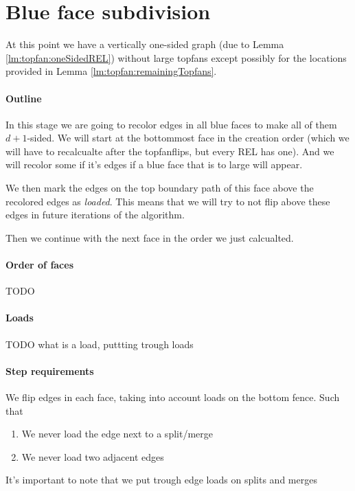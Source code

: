 
\section{Blue face subdivision}
\label{s:subdiv}


At this point we have a vertically one-sided graph (due to Lemma \ref{lm:topfan:oneSidedREL}) without large topfans except possibly for the locations provided in Lemma \ref{lm:topfan:remainingTopfans}.

\paragraph{Outline}
In this stage we are going to recolor edges in all blue faces to make all of them $d+1$-sided. We will start at the bottommost face in the creation order (which we will have to recalcualte after the topfanflips, but every REL has one). And we will recolor some if it's edges if a blue face that is to large will appear.

We then mark the edges on the top boundary path of this face above the recolored edges as \emph{loaded}. This means that we will try to not flip above these edges in future iterations of the algorithm.

Then we continue with the next face in the order we just calcualted.

\paragraph{Order of faces}
TODO

\paragraph{Loads}
TODO what is a load, puttting trough loads


\paragraph{Step requirements}
We flip edges in each face, taking into account loads on the bottom fence. Such that

\begin{enumerate}
  \item We never load the edge next to a split/merge
  \item We never load two adjacent edges
\end{enumerate}

It's important to note that we put trough edge loads on splits and merges

